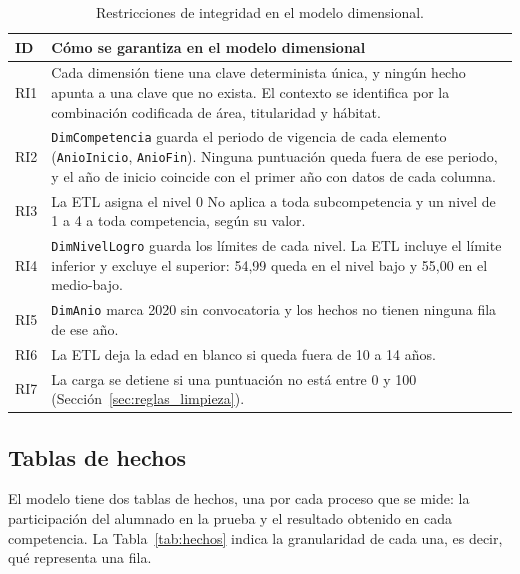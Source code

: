 \documentclass[12pt, a4paper, oneside]{report}
\begin{document}
\begin{table}[H]
\centering
\small
{}\renewcommand{\arraystretch}{1.1}
\begin{tabularx}{\textwidth}{@{} p{1.1cm} X @{}}
\toprule
\textbf{ID} & \textbf{Cómo se garantiza en el modelo dimensional} \\ \midrule
RI1 & Cada dimensión tiene una clave determinista única, y ningún hecho apunta a una clave que no exista. El contexto se identifica por la combinación codificada de área, titularidad y hábitat. \\ \addlinespace
RI2 & \texttt{DimCompetencia} guarda el periodo de vigencia de cada elemento (\texttt{AnioInicio}, \texttt{AnioFin}). Ninguna puntuación queda fuera de ese periodo, y el año de inicio coincide con el primer año con datos de cada columna. \\ \addlinespace
RI3 & La ETL asigna el nivel 0 \guillemotleft{}No aplica\guillemotright{} a toda subcompetencia y un nivel de 1 a 4 a toda competencia, según su valor. \\ \addlinespace
RI4 & \texttt{DimNivelLogro} guarda los límites de cada nivel. La ETL incluye el límite inferior y excluye el superior: 54,99 queda en el nivel bajo y 55,00 en el medio-bajo. \\ \addlinespace
RI5 & \texttt{DimAnio} marca 2020 sin convocatoria y los hechos no tienen ninguna fila de ese año. \\ \addlinespace
RI6 & La ETL deja la edad en blanco si queda fuera de 10 a 14 años. \\ \addlinespace
RI7 & La carga se detiene si una puntuación no está entre 0 y 100 (Sección~\ref{sec:reglas_limpieza}). \\ \bottomrule
\end{tabularx}
\caption{Restricciones de integridad en el modelo dimensional.}
\label{tab:ri_diseno}
\end{table}

\subsection{Tablas de hechos}
\label{sec:tablas_hechos}
El modelo tiene dos tablas de hechos, una por cada proceso que se mide: la participación del alumnado en la prueba y el resultado obtenido en cada competencia. La Tabla~\ref{tab:hechos} indica la granularidad de cada una, es decir, qué representa una fila.
\end{document}

